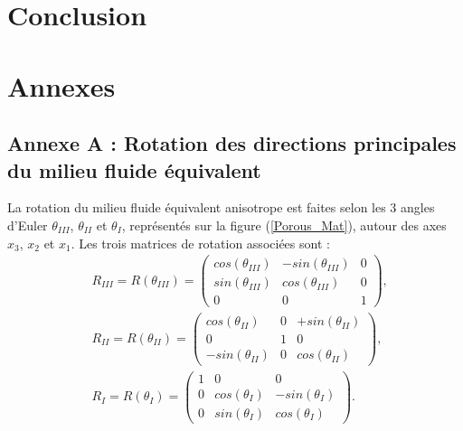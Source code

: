 \documentclass[12pt]{report}
\begin{document}
    

\chapter*{Conclusion}




\chapter*{Annexes}
\section*{Annexe A : Rotation des directions principales du milieu fluide équivalent}
\label{Ch_Ann_S_rot}

    La rotation du milieu fluide équivalent anisotrope est faites selon les 3 angles d'Euler $\theta_{III}$, $\theta_{II}$ et $\theta_{I}$, représentés sur la figure (\ref{Porous_Mat}), autour des axes $x_3$, $x_2$ et $x_1$. Les trois matrices de rotation associées sont :
    \begin{align}
        &R_{III}=R(\theta_{III})=\begin{pmatrix} 
                                    cos(\theta_{III}) & -sin(\theta_{III}) & 0 \\
                                    sin(\theta_{III}) & cos(\theta_{III}) & 0 \\
                                    0 & 0 & 1
                                \end{pmatrix},\\
        &R_{II}=R(\theta_{II})=\begin{pmatrix} 
                                    cos(\theta_{II}) & 0 & +sin(\theta_{II})\\
                                    0 & 1 & 0 \\
                                    -sin(\theta_{II}) & 0 & cos(\theta_{II})
                                \end{pmatrix},\\
        &R_{I}=R(\theta_{I})=\begin{pmatrix} 
                                    1 & 0 & 0\\
                                    0 & cos(\theta_{I}) & -sin(\theta_{I}) \\
                                    0 & sin(\theta_{I}) & cos(\theta_{I}) 
                                \end{pmatrix}.\\
    \end{align}
    
\end{document}
